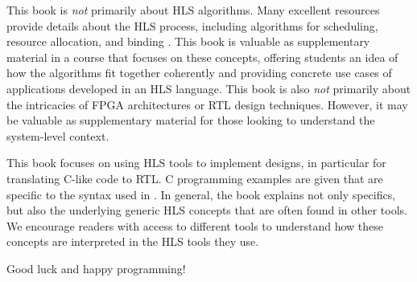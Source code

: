 This book is {\em not} primarily about HLS algorithms.  Many excellent resources provide details about the HLS process, including algorithms for scheduling, resource allocation, and binding \cite{micheli1994synthesis, gupta2004spark, coussy2010high, gajski2012high}.  This book is valuable as supplementary material in a course that focuses on these concepts, offering students an idea of how the algorithms fit together coherently and providing concrete use cases of applications developed in an HLS language.  This book is also {\em not} primarily about the intricacies of FPGA architectures or RTL design techniques.  However, it may be valuable as supplementary material for those looking to understand the system-level context.

This book focuses on using HLS tools to implement designs, in particular \VHLS for translating C-like code to RTL.  C programming examples are given that are specific to the syntax used in \VHLS.  In general, the book explains not only \VHLS specifics, but also the underlying generic HLS concepts that are often found in other tools.  We encourage readers with access to different tools to understand how these concepts are interpreted in the HLS tools they use.

Good luck and happy programming!
